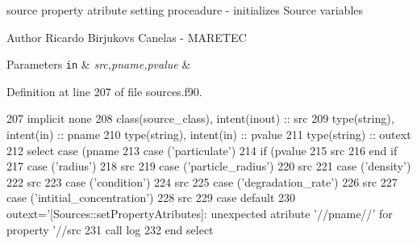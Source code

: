 source property atribute setting proceadure -\/ initializes Source variables 

\begin{DoxyAuthor}{Author}
Ricardo Birjukovs Canelas -\/ M\+A\+R\+E\+T\+EC 
\end{DoxyAuthor}

\begin{DoxyParams}[1]{Parameters}
\mbox{\tt in}  & {\em src,pname,pvalue} & \\
\hline
\end{DoxyParams}


Definition at line 207 of file sources.\+f90.


\begin{DoxyCode}
207     \textcolor{keywordtype}{implicit none}
208     \textcolor{keywordtype}{class}(source\_class), \textcolor{keywordtype}{intent(inout)} :: src
209     \textcolor{keywordtype}{type}(string), \textcolor{keywordtype}{intent(in)} :: pname
210     \textcolor{keywordtype}{type}(string), \textcolor{keywordtype}{intent(in)} :: pvalue
211     \textcolor{keywordtype}{type}(string) :: outext
212     \textcolor{keywordflow}{select case} (pname%
213     \textcolor{keywordflow}{case} (\textcolor{stringliteral}{'particulate'})
214         \textcolor{keywordflow}{if} (pvalue%
215             src%
216 \textcolor{keywordflow}{        end if}
217     \textcolor{keywordflow}{case} (\textcolor{stringliteral}{'radius'})
218         src%
219     \textcolor{keywordflow}{case} (\textcolor{stringliteral}{'particle\_radius'})
220         src%
221     \textcolor{keywordflow}{case} (\textcolor{stringliteral}{'density'})
222         src%
223     \textcolor{keywordflow}{case} (\textcolor{stringliteral}{'condition'})
224         src%
225     \textcolor{keywordflow}{case} (\textcolor{stringliteral}{'degradation\_rate'})
226         src%
227     \textcolor{keywordflow}{case} (\textcolor{stringliteral}{'intitial\_concentration'})
228         src%
229 \textcolor{keywordflow}{        case default}
230         outext=\textcolor{stringliteral}{'[Sources::setPropertyAtributes]: unexpected atribute '}//pname//\textcolor{stringliteral}{' for property '}//src%
231         \textcolor{keyword}{call }log%
232 \textcolor{keywordflow}{    end select}
\end{DoxyCode}
\mbox{\label{namespacesources__mod_aa76f16f8ee96bc86b553aa54d420321c}} 
